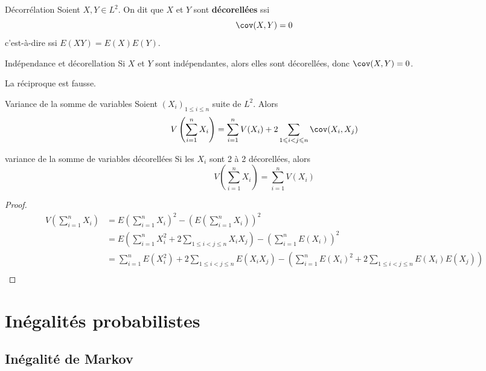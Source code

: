 \begin{definition}{Décorrélation}{}
    Soient $X, Y \in L^2$. On dit que $X$ et $Y$ sont \textbf{décorellées} ssi 
    $$ \cov(X, Y) = 0 $$
    c'est-à-dire ssi $E(XY) = E(X) E(Y)$.
\end{definition}

\begin{proposition}{Indépendance et décorellation}{}
    Si $X$ et $Y$ sont indépendantes, alors elles sont décorellées, donc $\cov(X, Y) = 0$.
\end{proposition}

\begin{remarque}
    La réciproque est fausse. 
\end{remarque}

\begin{theoreme}{Variance de la somme de variables}{}
    Soient $(X_i)_{1 \leqslant i \leqslant n}$ suite de $L^2$. Alors 
    $$ V\left( \sum_{i = 1}^n X_i \right) = \sum_{i = 1}^n V(X_i) + 2 \sum_{1 \leqslant i < j \leqslant n} \cov(X_i, X_j) $$
\end{theoreme}

\begin{corollaire}{variance de la somme de variables décorellées}{}
    Si les $X_i$ sont 2 à 2 décorellées, alors
    $$ V\left( \sum_{i = 1}^n X_i \right) = \sum_{i = 1}^n V(X_i) $$
\end{corollaire}

\begin{proof}
    \begin{align}
        V \left( \sum_{i = 1}^n X_i \right) & = E \left( \sum_{i = 1}^n X_i \right)^2 - \left( E \left( \sum_{i = 1}^n X_i \right) \right)^2 \\
        & = E \left( \sum_{i = 1}^n X_i^2 + 2 \sum_{1 \leqslant i < j \leqslant n} X_i X_j \right) - \left( \sum_{i = 1}^n E(X_i) \right)^2 \\
        & = \sum_{i = 1}^n E(X_i^2) + 2 \sum_{1 \leqslant i < j \leqslant n} E(X_i X_j) - \left( \sum_{i = 1}^n E(X_i)^2 + 2 \sum_{1 \leqslant i < j \leqslant n} E(X_i) E(X_j) \right) \\
    \end{align}
\end{proof}

\section{Inégalités probabilistes }
\subsection{Inégalité de Markov}

